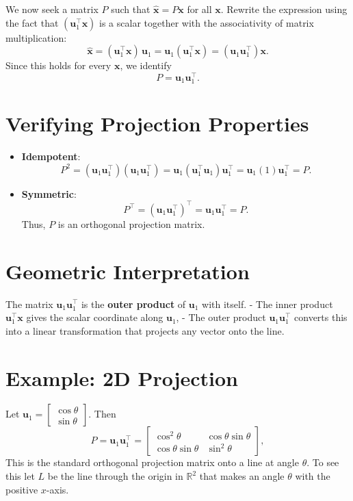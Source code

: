 We now seek a matrix $ P $ such that $ \hat{\mathbf{x}} = P\mathbf{x} $ for all $ \mathbf{x} $.  
Rewrite the expression using the fact that $(\mathbf{u}_1^\top \mathbf{x})$ is a scalar together with the associativity of matrix multiplication:
\[
\hat{\mathbf{x}} = (\mathbf{u}_1^\top \mathbf{x}) \, \mathbf{u}_1
= \mathbf{u}_1 (\mathbf{u}_1^\top \mathbf{x})
= (\mathbf{u}_1 \mathbf{u}_1^\top) \mathbf{x}.
\]
Since this holds for every $ \mathbf{x} $, we identify
\[
P = \mathbf{u}_1 \mathbf{u}_1^\top.
\]

\section*{Verifying Projection Properties}

\begin{itemize}
\item \textbf{Idempotent}: 
    \[
    P^2 = (\mathbf{u}_1 \mathbf{u}_1^\top)(\mathbf{u}_1 \mathbf{u}_1^\top)
    = \mathbf{u}_1 (\mathbf{u}_1^\top \mathbf{u}_1) \mathbf{u}_1^\top
    = \mathbf{u}_1 (1) \mathbf{u}_1^\top = P.
    \]

    \item \textbf{Symmetric}:
    \[
    P^\top = (\mathbf{u}_1 \mathbf{u}_1^\top)^\top = \mathbf{u}_1 \mathbf{u}_1^\top = P.
    \]
Thus, $ P $ is an orthogonal projection matrix.
\end{itemize}

\section*{Geometric Interpretation}

The matrix $ \mathbf{u}_1 \mathbf{u}_1^\top $ is the \textbf{outer product} of $ \mathbf{u}_1 $ with itself.  
- The inner product $ \mathbf{u}_1^\top \mathbf{x} $ gives the scalar coordinate along $ \mathbf{u}_1 $,
- The outer product $ \mathbf{u}_1 \mathbf{u}_1^\top $ converts this into a linear transformation that projects any vector onto the line.

\section*{Example: 2D Projection}

Let $ \mathbf{u}_1 = \begin{bmatrix} \cos \theta \\ \sin \theta \end{bmatrix} $. Then
\[
P = \mathbf{u}_1 \mathbf{u}_1^\top =
\begin{bmatrix}
\cos^2 \theta & \cos \theta \sin \theta \\
\cos \theta \sin \theta & \sin^2 \theta
\end{bmatrix},
\]
This is the standard orthogonal projection matrix onto a line at angle $ \theta $.
To see this let \( L \) be the line through the origin in \( \mathbb{R}^2 \) that makes an angle \( \theta \) with the positive \( x \)-axis.  



